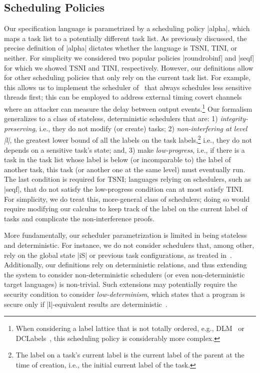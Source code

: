 \subsection{Scheduling Policies}
Our specification language is parametrized by a scheduling policy
|alpha|, which maps a task list to a potentially different task list.
%
As previously discussed, the precise definition of |alpha|
dictates whether the language is TSNI, TINI, or neither.
%
For simplicity we considered two popular policies |roundrobinf| and
|seqf| for which we showed TSNI and TINI, respectively.
%
However, our definitions allow for other scheduling policies that only
rely on the current task list.
%
For example, this allows us to implement the scheduler of~\cite{Kashyap:2011}
that always schedules less sensitive threads first; this can be
employed to address external timing covert channels where an attacker
can measure the delay between output events.\footnote{
  When considering a label lattice that is not totally ordered, e.g.,
  DLM~\cite{myers:dlm} or DCLabels~\cite{dclabels}, this scheduling policy is
  considerably more complex.
}
%
Our formalism generalizes to a class of stateless, deterministic
schedulers that are: 1) \emph{integrity-preserving}, i.e., they do not
modify (or create) tasks; 2) \emph{non-interfering at level |l|}, the
greatest lower bound of all the labels on the task labels,\footnote{
  The label on a task's current label is the current label of the
  parent at the time of creation, i.e., the initial current label of
  the task.
} i.e., they do not depends on a sensitive task's state; and, 3) make
\emph{low-progress}, i.e., if there is a task in the task list whose
label is below (or incomparable to) the label of another task, this
task (or another one at the same level) must eventually run.
%
The last condition is required for TSNI; languages relying on
schedulers, such as |seqf|, that do not satisfy the low-progress
condition can at most satisfy TINI.
%
For simplicity, we do treat this, more-general class of schedulers;
doing so would require modifying our calculus to keep track of the
label on the current label of tasks and complicate the
non-interference proofs.

More fundamentally, our scheduler parametrization is limited in being
stateless and deterministic.
%
For instance,  we do not consider  schedulers that, among other, rely
on the global state |iS| or previous task configurations, as treated
in~\cite{russo2006securing}.
%
Additionally, our definitions rely on deterministic relations,
and thus extending the system to consider non-deterministic schedulers
(or even non-deterministic target languages) is non-trivial.
%
Such extensions may potentially require the security condition to
consider \emph{low-determinism}, which states that a program is secure
only if |l|-equivalent results are
deterministic~\cite{Zdancewic:Myers:CSFW03, sabelfeld2003language}.

